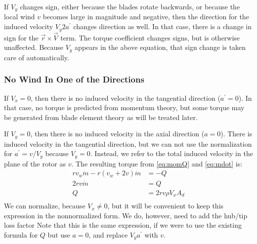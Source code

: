 \documentclass{article}
\begin{document}
If $V_y$ changes sign, either because the blades rotate backwards, or because the local wind $v$ becomes large in magnitude and negative, then the direction for the induced velocity $V_y 2 a^\prime$ changes direction as well.  In that case, there is a change in sign for the $\vec{r} \times \vec{V}$ term.  The torque coefficient changes signs, but is otherwise unaffected.  Because $V_y$ appears in the above equation, that sign change is taken care of automatically.

\subsubsection{No Wind In One of the Directions}

If $V_x = 0$, then there is no induced velocity in the tangential direction ($a^\prime = 0$).  In that case, no torque is predicted from momentum theory, but some torque may be generated from blade element theory as will be treated later.

If $V_y = 0$, then there is no induced velocity in the axial direction ($a = 0$).  There is induced velocity in the tangential direction, but we can not use the normalization for $a^\prime = v/V_y$ because $V_y = 0$.  Instead, we refer to the total induced velocity in the plane of the rotor as $v$.  The resulting torque from \cref{eq:momQ} and \cref{eq:mdot} is:
\begin{equation}
    \begin{aligned}
        r v_w \dot{m} - r (v_w + 2 v) \dot{m} &= -Q\\
        2 r v \dot{m} &= Q\\
        Q &= 2 r v \rho V_x A_d\\
    \end{aligned}
\end{equation}
We can normalize, because $V_x \ne 0$, but it will be convenient to keep this expression in the nonnormalized form.  We do, however, need to add the hub/tip loss factor
Note that this is the same expression, if we were to use the existing formula for $Q$ but use $a = 0$, and replace $V_y a^\prime$ with $v$.
\end{document}
